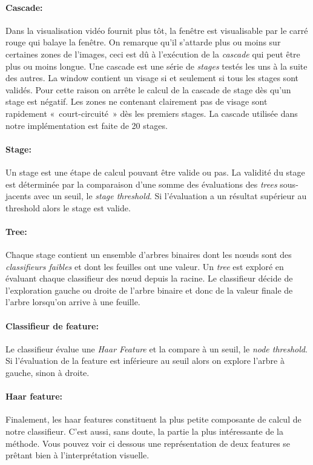 \documentclass[a4paper,11pt]{report}
\begin{document}
\paragraph{Cascade:}
	Dans la visualisation vidéo fournit plus tôt, la fenêtre est visualisable par le carré rouge qui balaye la fenêtre. On remarque qu’il s’attarde plus ou moins sur certaines zones de l’images, ceci est dû à l’exécution de la \textit{cascade} qui peut être plus ou moins longue. Une cascade est une série de \textit{stages} testés les uns à la suite des autres. La window contient un visage si et seulement si tous les stages sont validés. Pour cette raison on arrête le calcul de la cascade de stage dès qu’un stage est négatif. Les zones ne contenant clairement pas de visage sont rapidement « court-circuité » dès les premiers stages. La cascade utilisée dans notre implémentation est faite de 20 stages.


\paragraph{Stage:}
	Un stage est une étape de calcul pouvant être valide ou pas. La validité du stage est déterminée par la comparaison d’une somme des évaluations des \textit{trees} sous-jacents avec un seuil, le \textit{stage threshold}. Si l’évaluation a un résultat supérieur au threshold alors le stage est valide. 


\paragraph{Tree:}
	Chaque stage contient un ensemble d’arbres binaires dont les nœuds sont des \textit{classifieurs faibles} et dont les feuilles ont une valeur. Un \textit{tree} est exploré en évaluant chaque classifieur des nœud depuis la racine. Le classifieur décide de l’exploration gauche ou droite de l’arbre binaire et donc de la valeur finale de l’arbre lorsqu’on arrive à une feuille.


\paragraph{Classifieur de feature:}
	Le classifieur évalue une \textit{Haar Feature} et la compare à un seuil, le \textit{node threshold}. Si l’évaluation de la feature est inférieure au seuil alors on explore l’arbre à gauche, sinon à droite.


\paragraph{Haar feature:}
	Finalement, les haar features constituent la plus petite composante de calcul de notre classifieur. C’est aussi, sans doute, la partie la plus intéressante de la méthode. Vous pouvez voir ci dessous une représentation de deux features se prêtant bien à l’interprétation visuelle. 
\end{document}
